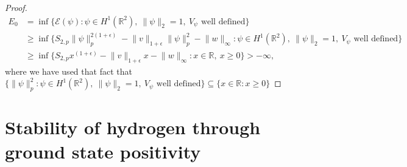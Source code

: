 \documentclass[a4paper,11pt]{article}
\newcommand{\R}{\mathbb{R}}
\numberwithin{equation}{section}
\begin{document}
\begin{proof}
\begin{equation}
\begin{aligned}
	E_0&=\inf\{\mathcal{E}(\psi):\psi\in H^1(\R^2),\ \lVert\psi \rVert_2=1,\ V_\psi\text{ well defined} \}\\&\geq \inf\{S_{2,p}\lVert \psi \rVert_p^{2(1+\epsilon)}-\lVert v\rVert_{1+\epsilon}\lVert \psi\rVert_p^2-\lVert w\rVert_\infty:\psi\in H^1(\R^2),\ \lVert\psi \rVert_2=1,\ V_\psi\text{ well defined} \}\\
	&\geq\inf\{S_{2,p} x^{(1+\epsilon)}-\lVert v\rVert_{1+\epsilon}x-\lVert w\rVert_\infty : x\in\R,\  x\geq0\}>-\infty,
	\end{aligned}
	\end{equation}
	where we have used that fact that\\ $ \{\lVert \psi \rVert_p^2 : \psi\in H^1(\R^2),\ \lVert\psi \rVert_2=1,\ V_\psi\text{ well defined}\}\subseteq \{x\in\R :  x\geq0\} $
\end{proof}
\section{Stability of hydrogen through ground state positivity}
\end{document}
